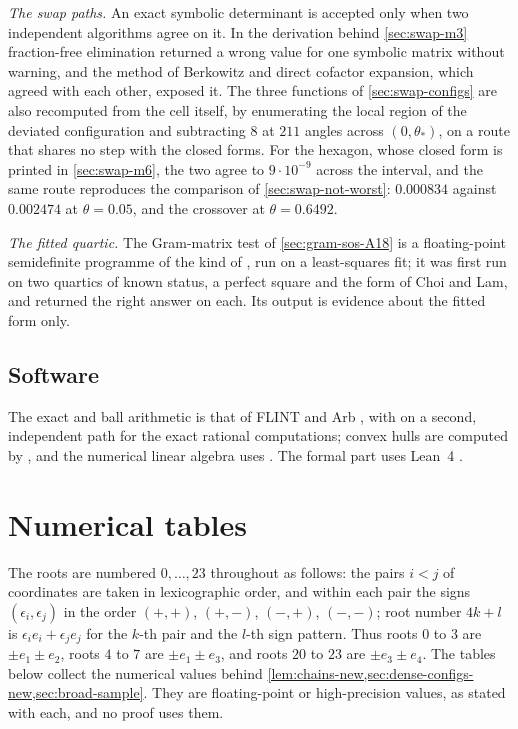 \documentclass[11pt,reqno]{amsart}
\renewcommand{\_}{\origunderscore\allowbreak}
\numberwithin{equation}{section}
\theoremstyle{plain}
\theoremstyle{definition}
\theoremstyle{remark}
\begin{document}
\emph{The swap paths.} An exact symbolic determinant is accepted only when
two independent algorithms agree on it. In the derivation behind
\cref{sec:swap-m3} fraction-free elimination returned a wrong value for one
symbolic matrix without warning, and the method of Berkowitz and direct
cofactor expansion, which agreed with each other, exposed it. The three
functions of \cref{sec:swap-configs} are also recomputed from the cell
itself, by enumerating the local region of the deviated configuration and
subtracting $8$ at $211$ angles across $(0,\theta_*)$, on a route that
shares no step with the closed forms. For the hexagon, whose closed form is
printed in \cref{sec:swap-m6}, the two agree to $9\cdot10^{-9}$ across the
interval, and the same route reproduces the comparison of
\cref{sec:swap-not-worst}: $0.000834$ against $0.002474$ at $\theta=0.05$,
and the crossover at $\theta=0.6492$.

\emph{The fitted quartic.} The Gram-matrix test of \cref{sec:gram-sos-A18}
is a floating-point semidefinite programme of the kind of \cite{Par03,Las01},
run on a least-squares fit; it was first run on two quartics of known
status, a perfect square and the form of Choi and Lam, and returned the
right answer on each. Its output is evidence about the fitted form only.

\subsection*{Software}

The exact and ball arithmetic is that of FLINT and Arb \cite{Joh17}, with
\cite{Meu17} on a second, independent path for the exact rational
computations; convex hulls are computed by \cite{BDH96}, and the numerical
linear algebra uses \cite{Har20,Vir20}. The formal part uses Lean~4
\cite{MU21}.


\section{Numerical tables}\label{app:numerical-tables}

The roots are numbered $0,\dots,23$ throughout as follows: the pairs
$i<j$ of coordinates are taken in lexicographic order, and within each
pair the signs $(\epsilon_i,\epsilon_j)$ in the order $(+,+)$, $(+,-)$,
$(-,+)$, $(-,-)$; root number $4k+l$ is $\epsilon_ie_i+\epsilon_je_j$ for
the $k$-th pair and the $l$-th sign pattern. Thus roots $0$ to $3$ are
$\pm e_1\pm e_2$, roots $4$ to $7$ are $\pm e_1\pm e_3$, and roots $20$ to
$23$ are $\pm e_3\pm e_4$. The tables below collect the numerical values
behind \cref{lem:chains-new,sec:dense-configs-new,sec:broad-sample}. They
are floating-point or high-precision values, as stated with each, and no
proof uses them.
\end{document}
